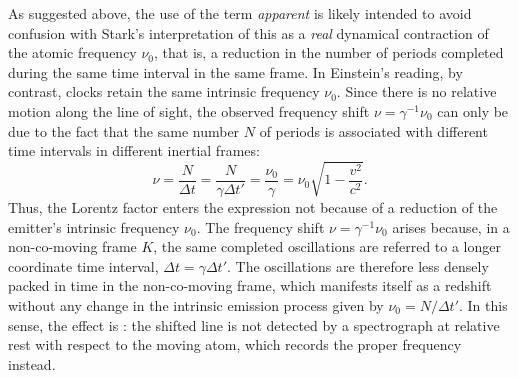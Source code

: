 \documentclass[submitted,12pt]{article}
\newcommand{\igamma}{\ensuremath{\gamma^{-1}}\xspace}
\begin{document}
As suggested above, the use of the term \emph{apparent} is likely intended to avoid confusion with Stark’s interpretation of this  as a \emph{real} dynamical contraction of the atomic frequency $\nu_0$, that is, a reduction in the number of periods completed during the same time interval in the same frame. In Einstein’s reading, by contrast, clocks retain the same intrinsic frequency $\nu_0$. Since there is no relative motion along the line of sight, the observed frequency shift $\nu=\igamma \nu_0$ can only be due to the fact that the same number $N$ of periods is associated with different time intervals in different inertial frames:
%
\begin{equation*}
\nu = \frac{N}{\Delta t} = \frac{N}{\gamma \Delta t'} = \frac{\nu_0}{\gamma} = \nu_0 \sqrt{1-\frac{v^2}{c^2}}.
\end{equation*}
%
Thus, the Lorentz factor enters the expression not because of a  reduction of the emitter's intrinsic frequency $\nu_0$. The frequency shift $\nu=\gamma^{-1}\nu_0$ arises because, in a non-co-moving frame $K$, the same completed oscillations are referred to a longer coordinate time interval, $\Delta t=\gamma \Delta t'$. The oscillations are therefore less densely packed in time in the non-co-moving frame, which manifests itself as a redshift without any change in the intrinsic emission process given by $\nu_0=N/\Delta t'$. In this sense, the effect is : the shifted line is not detected by a spectrograph at relative rest with respect to the moving atom, which records the proper frequency instead.
\end{document}
